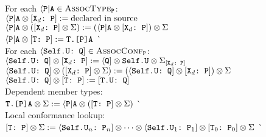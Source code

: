 \documentclass[../generics]{subfiles}
\begin{document}
\begin{tabbing}
For each $\langle\texttt{P}|\texttt{A} \in \textsc{AssocType}_{\texttt{P}}$:\\
\qquad $\langle\texttt{P}|\texttt{A}\otimes [\texttt{$\texttt{X}_d$:~P}] := \text{declared in source}$\\
\qquad $\langle\texttt{P}|\texttt{A}\otimes ([\texttt{$\texttt{X}_d$:~P}]\otimes \Sigma) := (\langle\texttt{P}|\texttt{A}\otimes [\texttt{$\texttt{X}_d$:~P}]) \otimes \Sigma$\\
\qquad $\langle\texttt{P}|\texttt{A} \otimes [\texttt{T:~P}] := \texttt{T.[P]A}$ \` \\[\medskipamount]
For each $\langle\texttt{Self.U:~Q}] \in \textsc{AssocConf}_{\texttt{P}}$:\\
\qquad $\langle\texttt{Self.U:~Q}]\otimes [\texttt{$\texttt{X}_d$:~P}] := \langle\texttt{Q}] \otimes \texttt{Self.U} \otimes \Sigma_{[\texttt{$\texttt{X}_d$:~P}]}$\\
\qquad $\langle\texttt{Self.U:~Q}]\otimes ([\texttt{$\texttt{X}_d$:~P}] \otimes \Sigma) := (\langle\texttt{Self.U:~Q}] \otimes [\texttt{$\texttt{X}_d$:~P}]) \otimes \Sigma$\\
\qquad $\langle\texttt{Self.U:~Q}] \otimes [\texttt{T:~P}] := [\texttt{T.U:~Q}]$\\[\medskipamount]
Dependent member types:\\
\qquad $\texttt{T.[P]A} \otimes \Sigma := \langle\texttt{P}|\texttt{A} \otimes ([\texttt{T:~P}] \otimes \Sigma)$ \` \\[\medskipamount]
Local conformance lookup:\\
\qquad $[\texttt{T:~P}] \otimes \Sigma :=
\langle\texttt{Self.$\texttt{U}_n$:~$\texttt{P}_n$}]
\otimes
\cdots
\otimes
\langle\texttt{Self.$\texttt{U}_1$:~$\texttt{P}_1$}]
\otimes
[\texttt{$\texttt{T}_0$:~$\texttt{P}_0$}] \otimes \Sigma$ \` 
\end{tabbing}
\end{document}
